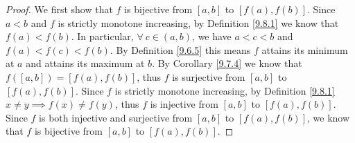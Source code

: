 \begin{proof}
    We first show that \(f\) is bijective from \([a, b]\) to \([f(a), f(b)]\).
    Since \(a < b\) and \(f\) is strictly monotone increasing, by Definition \ref{9.8.1} we know that \(f(a) < f(b)\).
    In particular, \(\forall\ c \in (a, b)\), we have \(a < c < b\) and \(f(a) < f(c) < f(b)\).
    By Definition \ref{9.6.5} this means \(f\) attains its minimum at \(a\) and attains its maximum at \(b\).
    By Corollary \ref{9.7.4} we know that \(f([a, b]) = [f(a), f(b)]\), thus \(f\) is surjective from \([a, b]\) to \([f(a), f(b)]\).
    Since \(f\) is strictly monotone increasing, by Definition \ref{9.8.1} \(x \neq y \implies f(x) \neq f(y)\), thus \(f\) is injective from \([a, b]\) to \([f(a), f(b)]\).
    Since \(f\) is both injective and surjective from \([a, b]\) to \([f(a), f(b)]\), we know that \(f\) is bijective from \([a, b]\) to \([f(a), f(b)]\).


\end{proof}
